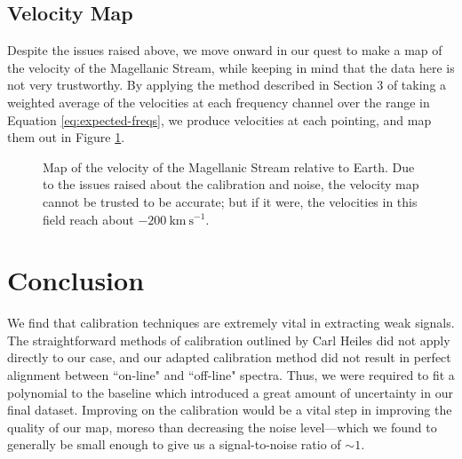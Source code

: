 \documentclass[12pt]{article}
\begin{document}
\subsection*{Velocity Map}
Despite the issues raised above, we move onward in our quest to make a map of the velocity of the Magellanic Stream, while keeping in mind that the data here is not very trustworthy. By applying the method described in Section 3 of taking a weighted average of the velocities at each frequency channel over the range in Equation \ref{eq:expected-freqs}, we produce velocities at each pointing, and map them out in Figure \ref{fig:velocities}.

\begin{figure}[H]
\caption[SODUMB]{Map of the velocity of the Magellanic Stream relative to Earth. Due to the issues raised about the calibration and noise, the velocity map cannot be trusted to be accurate; but if it were, the velocities in this field reach about $-200\ \mathrm{km\ s^{-1}}$.
}
\label{fig:velocities}
\end{figure}

\section{Conclusion}
We find that calibration techniques are extremely vital in extracting weak signals. The straightforward methods of calibration outlined by Carl Heiles did not apply directly to our case, and our adapted calibration method did not result in perfect alignment between ``on-line" and ``off-line" spectra. Thus, we were required to fit a polynomial to the baseline which introduced a great amount of uncertainty in our final dataset. Improving on the calibration would be a vital step in improving the quality of our map, moreso than decreasing the noise level---which we found to generally be small enough to give us a signal-to-noise ratio of $\sim1$.
\end{document}
